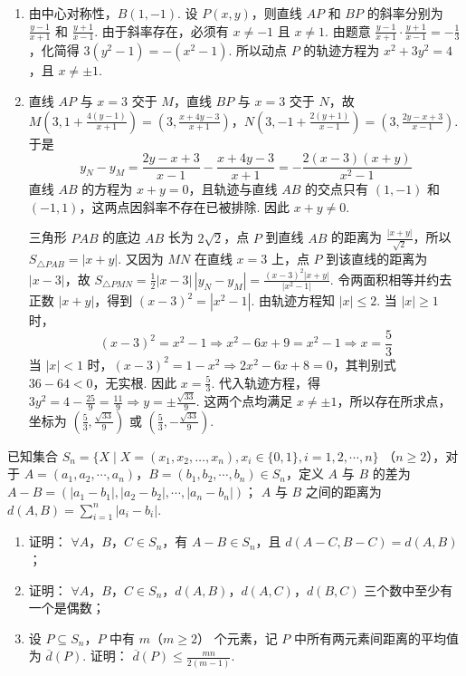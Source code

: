 \begin{solution}
\begin{enumerate}
\item 由中心对称性，\(B(1,-1)\). 设 \(P(x,y)\)，则直线 \(AP\) 和 \(BP\) 的斜率分别为 \(\frac{y-1}{x+1}\) 和 \(\frac{y+1}{x-1}\).
由于斜率存在，必须有 \(x\neq-1\) 且 \(x\neq1\). 由题意 \(\frac{y-1}{x+1}\cdot\frac{y+1}{x-1}=-\frac{1}{3}\)，化简得 \(3(y^{2}-1)=-(x^{2}-1)\).
所以动点 \(P\) 的轨迹方程为 \(x^{2}+3y^{2}=4\)，且 \(x\neq\pm1\).

\item 直线 \(AP\) 与 \(x=3\) 交于 \(M\)，直线 \(BP\) 与 \(x=3\) 交于 \(N\)，故
\(M\left(3,1+\frac{4(y-1)}{x+1}\right)=\left(3,\frac{x+4y-3}{x+1}\right)\)，\(N\left(3,-1+\frac{2(y+1)}{x-1}\right)=\left(3,\frac{2y-x+3}{x-1}\right)\).
于是
\[
y_N-y_M=\frac{2y-x+3}{x-1}-\frac{x+4y-3}{x+1}=-\frac{2(x-3)(x+y)}{x^{2}-1}
\]
直线 \(AB\) 的方程为 \(x+y=0\)，且轨迹与直线 \(AB\) 的交点只有 \((1,-1)\) 和 \((-1,1)\)，这两点因斜率不存在已被排除. 因此 \(x+y\neq0\).

三角形 \(PAB\) 的底边 \(AB\) 长为 \(2\sqrt{2}\)，点 \(P\) 到直线 \(AB\) 的距离为 \(\frac{|x+y|}{\sqrt{2}}\)，所以 \(S_{\triangle PAB}=|x+y|\). 又因为 \(MN\) 在直线 \(x=3\) 上，点 \(P\) 到该直线的距离为 \(|x-3|\)，故 \(S_{\triangle PMN}=\frac{1}{2}|x-3|\,|y_N-y_M|=\frac{(x-3)^{2}|x+y|}{|x^{2}-1|}\). 令两面积相等并约去正数 \(|x+y|\)，得到 \((x-3)^{2}=|x^{2}-1|\).
由轨迹方程知 \(|x|\leqslant2\). 当 \(|x|\geqslant1\) 时，
\[
(x-3)^{2}=x^{2}-1\Longrightarrow x^{2}-6x+9=x^{2}-1\Longrightarrow x=\frac{5}{3}
\]
当 \(|x|<1\) 时，\((x-3)^{2}=1-x^{2}\Longrightarrow 2x^{2}-6x+8=0\)，其判别式 \(36-64<0\)，无实根. 因此 \(x=\frac{5}{3}\). 代入轨迹方程，得 \(3y^{2}=4-\frac{25}{9}=\frac{11}{9}\Longrightarrow y=\pm\frac{\sqrt{33}}{9}\).
这两个点均满足 \(x\neq\pm1\)，所以存在所求点，坐标为 \(\left(\frac{5}{3},\frac{\sqrt{33}}{9}\right)\) 或 \(\left(\frac{5}{3},-\frac{\sqrt{33}}{9}\right)\).
\end{enumerate}
\end{solution}

\begin{problem}
已知集合 \( S_{n} = \{X \mid X = (x_{1}, x_{2}, \ldots, x_{n}), x_{i} \in \{0, 1\}, i = 1, 2, \cdots, n\} \) （\( n \geqslant 2 \)），对于 \( A = (a_{1}, a_{2}, \cdots, a_{n}) \)，\( B = (b_{1}, b_{2}, \cdots, b_{n}) \in S_{n} \)，定义 \(A\) 与 \(B\) 的差为 \( A - B = (|a_{1} - b_{1}|, |a_{2} - b_{2}|, \cdots, |a_{n} - b_{n}|) \)； \(A\) 与 \(B\) 之间的距离为 \( d(A, B) = \sum_{i=1}^{n} |a_{i} - b_{i}| \).
\begin{enumerate}
\item 证明： \(\forall A\)，\(B\)，\(C \in S_n\)，有 \(A - B \in S_n\)，且 \(d(A - C, B - C) = d(A, B)\)；
\item 证明： \(\forall A\)，\(B\)，\(C \in S_n\)，\(d(A, B)\)，\(d(A, C)\)，\(d(B, C)\) 三个数中至少有一个是偶数；
\item 设 \(P \subseteq S_n\)，\(P\) 中有 \(m\)（\(m \geqslant 2\)） 个元素，记 \(P\) 中所有两元素间距离的平均值为 \(\overline{d}(P)\). 证明： \(\overline{d}(P) \leqslant \frac{mn}{2(m - 1)}\).
\end{enumerate}
\end{problem}

